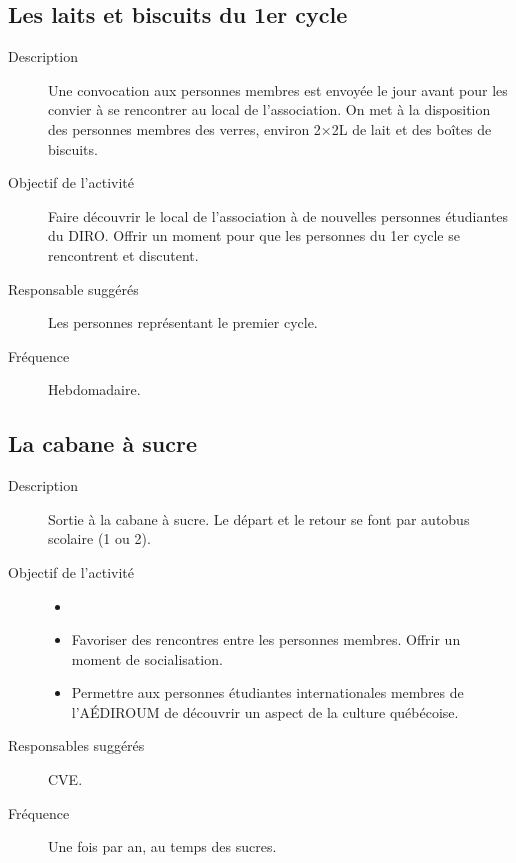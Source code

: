 \documentclass{aediroum}
\begin{document}
\subsection{Les laits et biscuits du 1er cycle}
\begin{description}
	\item[Description] Une convocation aux personnes membres est envoyée le jour avant pour les convier à se rencontrer au local de l'association. On met à la disposition des personnes membres des verres, environ 2$\times$2L de lait et des boîtes de biscuits.
	\item[Objectif de l'activité] Faire découvrir le local de l'association à de nouvelles personnes étudiantes du DIRO. Offrir un moment pour que les personnes du 1er cycle se rencontrent et discutent.
	\item[Responsable suggérés] Les personnes représentant le premier cycle.
	\item[Fréquence] Hebdomadaire.
\end{description}

\subsection{La cabane à sucre}
\begin{description}
	\item[Description] Sortie à la cabane à sucre. Le départ et le retour se font par autobus scolaire (1 ou 2).
	\item[Objectif de l'activité]
	\begin{itemize}
            \item[]
            \item Favoriser des rencontres entre les personnes membres. Offrir un moment de socialisation.
            \item Permettre aux personnes étudiantes internationales membres de l'AÉDIROUM de découvrir un aspect de la culture québécoise.
	\end{itemize}
	\item[Responsables suggérés] CVE.
	\item[Fréquence] Une fois par an, au temps des sucres.
\end{description}
\end{document}
